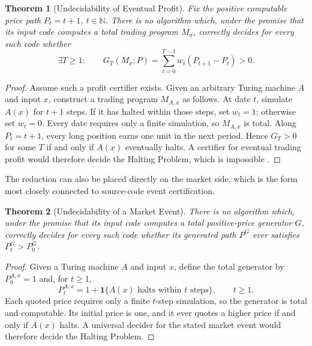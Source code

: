 \documentclass[aps,pra,reprint,superscriptaddress,amsmath,amssymb,floatfix]{revtex4-2}
\theoremstyle{plain}
\newtheorem{theorem}{Theorem}
\theoremstyle{definition}
\theoremstyle{remark}
\begin{document}
\begin{theorem}[Undecidability of Eventual Profit]
  \label{thm:profit-undecidable}
  Fix the positive computable price path \(P_t=t+1\), \(t\in\mathbb{N}\).
  There is no algorithm which, under the promise that its input code computes
  a total trading program \(M_\sigma\), correctly decides for every such code
  whether
  \[
    \exists T\geq1:\qquad
    G_T(M_\sigma;P)=
    \sum_{t=0}^{T-1}w_t(P_{t+1}-P_t)>0.
  \]
\end{theorem}

\begin{proof}
Assume such a profit certifier exists. Given an arbitrary Turing machine
\(A\) and input \(x\), construct a trading program \(M_{A,x}\) as follows.
At date \(t\), simulate \(A(x)\) for \(t+1\) steps. If it has halted within
those steps, set \(w_t=1\); otherwise set \(w_t=0\). Every date requires only
a finite simulation, so \(M_{A,x}\) is total. Along \(P_t=t+1\), every long
position earns one unit in the next period. Hence \(G_T>0\) for some \(T\) if
and only if \(A(x)\) eventually halts. A certifier for eventual trading profit
would therefore decide the Halting Problem, which is impossible
\cite{turing-36}.
\end{proof}

The reduction can also be placed directly on the market side, which is the
form most closely connected to source-code event certification.

\begin{theorem}[Undecidability of a Market Event]
  \label{thm:market-undecidable}
  There is no algorithm which, under the promise that its input code computes
  a total positive-price generator \(G\), correctly decides for every such
  code whether its generated path \(P^G\) ever satisfies \(P_t^G>P_0^G\).
\end{theorem}

\begin{proof}
Given a Turing machine \(A\) and input \(x\), define the total generator by
\(P_0^{A,x}=1\) and, for \(t\geq1\),
\begin{equation}
  P_t^{A,x}
  =1+\mathbf{1}\{A(x)\text{ halts within }t\text{ steps}\},
  \qquad t\geq1 .
  \label{eq:market-halting}
\end{equation}
Each quoted price requires only a finite \(t\)-step simulation, so the
generator is total and computable. Its initial price is one, and it ever quotes
a higher price if and only if \(A(x)\) halts. A universal decider for the stated
market event would therefore decide the Halting Problem.
\end{proof}
\end{document}
